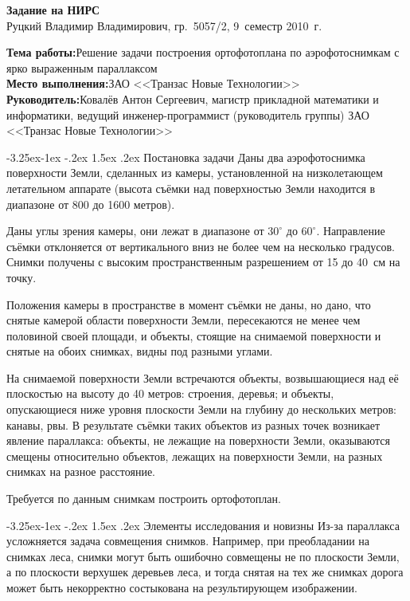 \documentclass[a4paper,10pt]{article}
\makeatletter
\renewcommand\paragraph{\@startsection{paragraph}{4}{\z@}%
  {-3.25ex\@plus -1ex \@minus -.2ex}%
  {1.5ex \@plus .2ex}%
  {\normalfont\normalsize\bfseries}}
\makeatother
\begin{document}

\begin{center}
\begin{spacing}{1.3}
  {\Large\bfseries Задание на НИРС} \\
  {\large Руцкий Владимир Владимирович, гр.~5057/2, 9~семестр 2010~г.}
\end{spacing}
\end{center}

\noindent\textbf{Тема работы:}\quad Решение задачи построения ортофотоплана по аэрофотоснимкам с ярко выраженным параллаксом \\
\textbf{Место выполнения:}\quad ЗАО <<Транзас Новые Технологии>> \\
\textbf{Руководитель:}\quad Ковалёв Антон Сергеевич, 
магистр прикладной математики и информатики, 
ведущий инженер-программист (руководитель группы) ЗАО <<Транзас Новые Технологии>>

\paragraph{Постановка задачи}
Даны два аэрофотоснимка поверхности Земли, сделанных из камеры, установленной на низколетающем летательном аппарате
(высота съёмки над поверхностью Земли находится в диапазоне от 800 до 1600 метров).

Даны углы зрения камеры, они лежат в диапазоне от $30^{\circ}$ до $60^{\circ}$.
Направление съёмки отклоняется от вертикального вниз не более чем на несколько градусов.
Снимки получены с высоким пространственным разрешением от 15 до 40~см на точку.

Положения камеры в пространстве в момент съёмки не даны, но
дано, что снятые камерой области поверхности Земли, пересекаются не менее чем половиной своей площади,
и объекты, стоящие на снимаемой поверхности и снятые на обоих снимках, видны под разными углами.

На снимаемой поверхности Земли встречаются объекты, возвышающиеся над её плоскостью на высоту до 40 метров: 
строения, деревья; 
и объекты, опускающиеся ниже уровня плоскости Земли на глубину до нескольких метров: канавы, рвы.
В результате съёмки таких объектов из разных точек возникает явление параллакса:
объекты, не лежащие на поверхности Земли, оказываются смещены относительно объектов, лежащих на поверхности Земли,
на разных снимках на разное расстояние.

Требуется по данным снимкам построить ортофотоплан.

\paragraph{Элементы исследования и новизны}
Из-за параллакса усложняется задача совмещения снимков. 
Например, при преобладании на снимках леса,
снимки могут быть ошибочно совмещены не по плоскости Земли, 
а по плоскости верхушек деревьев леса, и
тогда снятая на тех же снимках дорога может быть некорректно состыкована на результирующем изображении.
\end{document}
